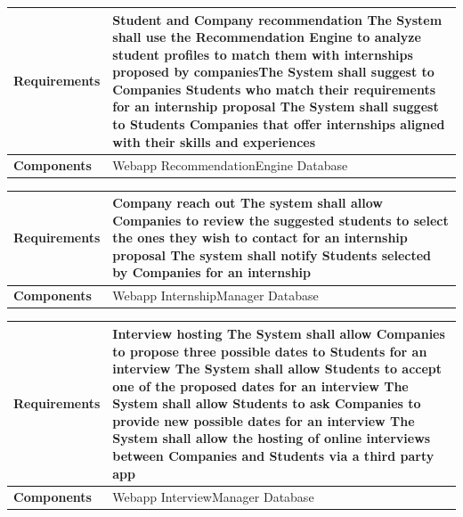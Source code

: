 \begin{tabular}{|p{3cm}|p{9cm}|}
    \hline
\textbf{Requirements} & \textbf{Student and Company recommendation} \newline [R12] The System shall use the Recommendation Engine to analyze student profiles to match them with internships proposed by companies\newline [R13] The System shall suggest to Companies Students who match their requirements for an internship proposal \newline [R14] The System shall suggest to Students Companies that offer internships aligned with their skills and experiences \\  \hline
    \textbf{Components} & Webapp \newline RecommendationEngine \newline Database \\ \hline
    \end{tabular}
    \newline
    \newline

\begin{tabular}{|p{3cm}|p{9cm}|}
    \hline
\textbf{Requirements} & \textbf{Company reach out} \newline [R15] The system shall allow Companies to review the suggested students to select the ones they wish to contact for an internship proposal \newline [R16] The system shall notify Students selected by Companies for an internship \\  \hline
    \textbf{Components} & Webapp \newline InternshipManager \newline Database \\ \hline
    \end{tabular}
    \newline
    \newline

\begin{tabular}{|p{3cm}|p{9cm}|}
    \hline
\textbf{Requirements} & \textbf{Interview hosting} \newline [R17] The System shall allow Companies to propose three possible dates to Students for an interview \newline [R18] The System shall allow Students to accept one of the proposed dates for an interview \newline [R19] The System shall allow Students to ask Companies to provide new possible dates for an interview \newline [R20] The System shall allow the hosting of online interviews between Companies and Students via a third party app \\  \hline
    \textbf{Components} & Webapp \newline InterviewManager \newline Database \\ \hline
    \end{tabular}
    \newline
    \newline

